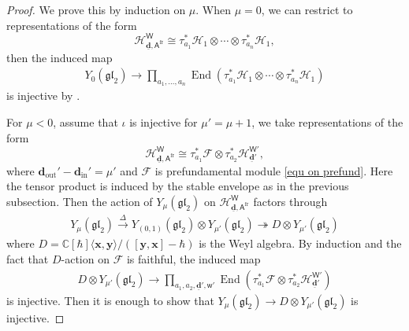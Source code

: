 \documentclass[10pt]{amsart}
\theoremstyle{definition}
\numberwithin{equation}{section}
\newcommand{\bC}{\mathbb{C}}
\newcommand{\bd}{\mathbf{d}}
\newcommand{\cF}{\mathcal{F}}
\newcommand{\cH}{\mathcal{H}}
\newcommand{\sA}{\mathsf{A}}
\newcommand{\sW}{\mathsf{W}}
\newcommand{\sw}{\mathsf{w}}
\newcommand{\End}{\operatorname{End}}
\newcommand{\In}{\operatorname{in}}
\newcommand{\Out}{\operatorname{out}}
\begin{document}
\begin{proof}
We prove this by induction on $\mu$. When $\mu=0$, we can restrict to representations of the form 
$$\cH^{\sW}_{\underline{\bd},\sA^{\mathrm{fr}}}\cong \tau^*_{a_1}\cH_1\otimes\cdots \otimes\tau^*_{a_n}\cH_1,$$ 
then the induced map
\begin{align*}
    Y_{0}(\mathfrak{gl}_2)\to \prod_{a_1,\ldots,a_n}\End(\tau^*_{a_1}\cH_1\otimes\cdots \otimes\tau^*_{a_n}\cH_1)
\end{align*}
is injective by \cite[\S 11.3.2]{MO}. 

For $\mu<0$, assume that $\iota$ is injective for $\mu'=\mu+1$, we take representations of the form 
$$\cH^{\sW}_{\underline{\bd},\sA^{\mathrm{fr}}}\cong \tau^*_{a_1}\cF\otimes \tau^*_{a_2}\cH^{\sW'}_{\underline{\bd}'},$$ where $\bd_{\Out}'-\bd_{\In}'=\mu'$ and $\cF$ is prefundamental module \eqref{equ on prefund}. Here the tensor product is induced by the stable envelope as in the previous subsection. Then the action of $Y_{\mu}(\mathfrak{gl}_2)$ on $\cH^{\sW}_{\underline{\bd},\sA^{\mathrm{fr}}}$ factors through 
\begin{align*}
    Y_{\mu}(\mathfrak{gl}_2)\xrightarrow{\Delta} Y_{(0,1)}(\mathfrak{gl}_2)\otimes Y_{\mu'}(\mathfrak{gl}_2)\twoheadrightarrow D\otimes Y_{\mu'}(\mathfrak{gl}_2)
\end{align*}
where $D=\bC[\hbar]\langle\mathbf x,\mathbf y\rangle/([\mathbf y,\mathbf x]-\hbar)$ is the Weyl algebra. By induction and the fact that $D$-action on $\mathcal F$ is faithful, the induced map
\begin{align*}
    D\otimes Y_{\mu'}(\mathfrak{gl}_2)\to \prod_{a_1,a_2,\underline{\bd}',\sw' }\End(\tau^*_{a_1}\cF\otimes \tau^*_{a_2}\cH^{\sW'}_{\underline{\bd}'})
\end{align*}
is injective. Then it is enough to show that $Y_{\mu}(\mathfrak{gl}_2)\to D\otimes Y_{\mu'}(\mathfrak{gl}_2)$ is injective. 


\end{proof}
\end{document}
